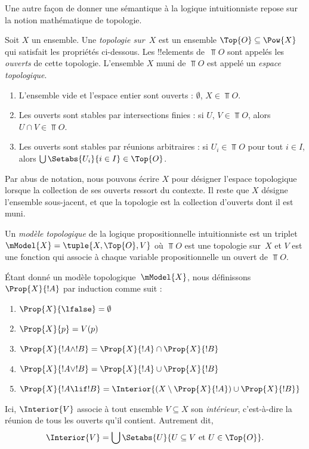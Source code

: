 \documentclass[../../../include/open-logic-section]{subfiles}
\begin{document}


Une autre façon de donner une sémantique à la logique intuitionniste
repose sur la notion mathématique de topologie.

\begin{defn}
  Soit $X$ un ensemble. Une \emph{topologie sur~$X$} est un ensemble
  $\Top{O} \subseteq \Pow{X}$ qui satisfait les propriétés ci-dessous.
  Les !!{element}s de~$\Top{O}$ sont appelés les \emph{ouverts} de
  cette topologie. L'ensemble $X$ muni de $\Top{O}$ est appelé un
  \emph{espace topologique}.
  \begin{enumerate}
  \item L'ensemble vide et l'espace entier sont ouverts : $\emptyset$, $X \in
    \Top{O}$.
  \item Les ouverts sont stables par intersections finies : si $U$, $V \in
    \Top{O}$, alors $U \cap V \in \Top{O}$.
  \item Les ouverts sont stables par réunions arbitraires : si $U_i \in
    \Top{O}$ pour tout $i \in I$, alors $\bigcup \Setabs{U_i}{i \in
      I} \in \Top{O}$.
  \end{enumerate}
\end{defn}

Par abus de notation, nous pouvons écrire $X$ pour désigner l'espace
topologique lorsque la collection de ses ouverts ressort du contexte.
Il reste que $X$ désigne l'ensemble sous-jacent, et que la topologie
est la collection d'ouverts dont il est muni.

\begin{defn}
  Un \emph{modèle topologique} de la logique propositionnelle
  intuitionniste est un triplet $\mModel{X} = \tuple{X, \Top{O}, V}$ où
  $\Top{O}$ est une topologie sur~$X$ et $V$ est une fonction qui
  associe à chaque variable propositionnelle un ouvert de
  $\Top{O}$.

  Étant donné un modèle topologique~$\mModel{X}$, nous définissons
  $\Prop{X}{!A}$ par induction comme suit :
  \begin{enumerate}
  \item $\Prop{X}{\lfalse} = \emptyset$
  \item $\Prop{X}{p} = V(p)$
  \item $\Prop{X}{!A \land !B} = \Prop{X}{!A} \cap \Prop{X}{!B}$
  \item $\Prop{X}{!A \lor !B} = \Prop{X}{!A} \cup \Prop{X}{!B}$
  \item $\Prop{X}{!A \lif !B} = \Interior{(X \setminus \Prop{X}{!A}) \cup
    \Prop{X}{!B}}$
  \end{enumerate}
  Ici, $\Interior{V}$ associe à tout ensemble $V \subseteq X$ son
  \emph{intérieur}, c'est-à-dire la réunion de tous les ouverts qu'il
  contient. Autrement dit,
  \[
  \Interior{V} = \bigcup \Setabs{U}{U \subseteq V \text{ et } U \in \Top{O}}.
  \]
\end{defn}
\end{document}
